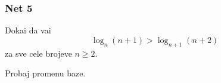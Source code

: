 \subsubsection{Net 5}
 
\zadatak 
Doka{\zv}i da va{\zv}i
$$
\log_n(n + 1) > \log_{n+1}(n+2)
$$
za sve cele brojeve $n\ge2$.

\resenje Probaj promenu baze.
